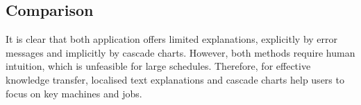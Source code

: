 \subsection{Comparison}

It is clear that both application offers limited explanations, explicitly by error messages and implicitly by cascade charts. However, both methods require human intuition, which is unfeasible for large schedules. Therefore, for effective knowledge transfer, localised text explanations and cascade charts help users to focus on key machines and jobs.